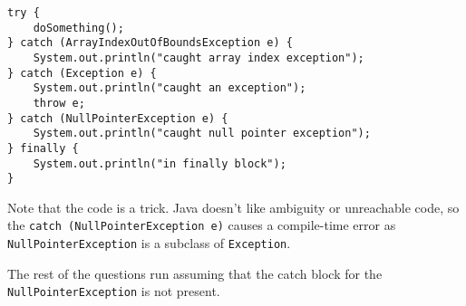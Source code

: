 \begin{blocksection}
\question

\begin{lstlisting}
try {
    doSomething();
} catch (ArrayIndexOutOfBoundsException e) {
    System.out.println("caught array index exception");
} catch (Exception e) {
    System.out.println("caught an exception");
    throw e;
} catch (NullPointerException e) {
    System.out.println("caught null pointer exception");
} finally {
    System.out.println("in finally block");
}
\end{lstlisting}

\begin{solution}
Note that the code is a trick. Java doesn't like ambiguity or unreachable code,
so the \lstinline$catch (NullPointerException e)$ causes a compile-time error
as \lstinline$NullPointerException$ is a subclass of \lstinline$Exception$.

The rest of the questions run assuming that the catch block for the
\lstinline$NullPointerException$ is not present.
\end{solution}



\end{blocksection}
